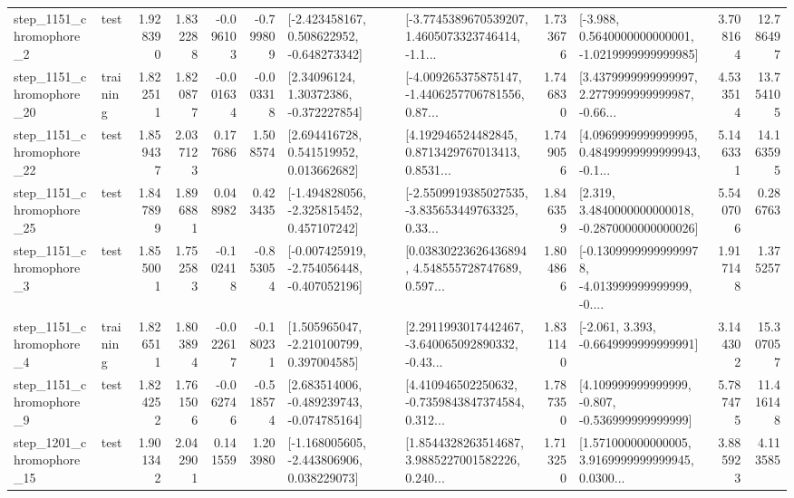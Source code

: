 \begin{tabular}{llrrrrllrlrr}
  step\_1151\_chromophore\_2 &      test &      1.928390 &    1.832288 &     -0.096103 & -0.799809 &   [-2.423458167, 0.508622952, -0.648273342] &  [-3.7745389670539207, 1.4605073323746414, -1.1... &       1.733676 &  [-3.988, 0.5640000000000001, -1.0219999999999985] &            3.708164 &         12.786497 \\
 step\_1151\_chromophore\_20 &  training &      1.822511 &    1.820877 &     -0.001634 & -0.003318 &      [2.34096124, 1.30372386, -0.372227854] &  [-4.009265375875147, -1.4406257706781556, 0.87... &       1.746830 &  [3.4379999999999997, 2.2779999999999987, -0.66... &            4.533514 &         13.754105 \\
 step\_1151\_chromophore\_22 &      test &      1.859437 &    2.037123 &      0.177686 &  1.508574 &     [2.694416728, 0.541519952, 0.013662682] &  [4.192946524482845, 0.8713429767013413, 0.8531... &       1.749056 &  [4.0969999999999995, 0.48499999999999943, -0.1... &            5.146331 &         14.163595 \\
 step\_1151\_chromophore\_25 &      test &      1.847899 &    1.896881 &      0.048982 &  0.423435 &   [-1.494828056, -2.325815452, 0.457107242] &  [-2.5509919385027535, -3.835653449763325, 0.33... &       1.846359 &   [2.319, 3.4840000000000018, -0.2870000000000026] &            5.540706 &          0.286763 \\
  step\_1151\_chromophore\_3 &      test &      1.855001 &    1.752583 &     -0.102418 & -0.853054 &  [-0.007425919, -2.754056448, -0.407052196] &  [0.03830223626436894, 4.548555728747689, 0.597... &       1.804866 &  [-0.13099999999999978, -4.013999999999999, -0.... &            1.917148 &          1.375257 \\
  step\_1151\_chromophore\_4 &  training &      1.826511 &    1.803894 &     -0.022617 & -0.180231 &    [1.505965047, -2.210100799, 0.397004585] &  [2.2911993017442467, -3.640065092890332, -0.43... &       1.831140 &               [-2.061, 3.393, -0.6649999999999991] &            3.144302 &         15.307057 \\
  step\_1151\_chromophore\_9 &      test &      1.824252 &    1.761506 &     -0.062746 & -0.518574 &   [2.683514006, -0.489239743, -0.074785164] &  [4.410946502250632, -0.7359843847374584, 0.312... &       1.787350 &    [4.109999999999999, -0.807, -0.536999999999999] &            5.787475 &         11.416148 \\
 step\_1201\_chromophore\_15 &      test &      1.901342 &    2.042901 &      0.141559 &  1.203980 &   [-1.168005605, -2.443806906, 0.038229073] &  [1.8544328263514687, 3.9885227001582226, 0.240... &       1.713250 &  [1.571000000000005, 3.9169999999999945, 0.0300... &            3.885923 &          4.113585 \\

\end{tabular}
